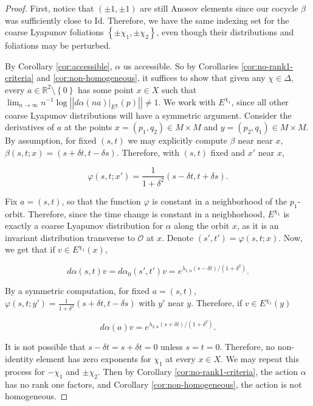 \documentclass[12pt]{amsart}
\theoremstyle{definition}
\theoremstyle{remark}
\numberwithin{equation}{section}
\newcommand{\id}{\mathrm{Id}}
\newcommand{\R}{\mathbb{R}}
\newcommand{\mc}{\mathcal}
\newcommand{\set}[1]{\left\lbrace #1 \right\rbrace}
\newcommand{\norm}[1]{{\left|\left| #1 \right|\right|}}
\newtheorem{Structural Stability Theorem}[theorem]{Structural Stability Theorem}
\begin{document}
\begin{proof}
First, notice that $(\pm 1,\pm 1)$ are still Anosov elements since our cocycle $\beta$ was sufficiently close to $\id$. Therefore, we have the same indexing set for the coarse Lyapunov foliations $\set{\pm \chi_1,\pm \chi_2}$, even though their distributions and foliations may be perturbed.

By Corollary \ref{cor:accessible}, $\alpha$ us accessible. So by Corollaries \ref{cor:no-rank1-criteria} and \ref{cor:non-homogeneous}, it suffices to show that given any $\chi \in \Delta$, every $a \in \R^2 \setminus \set{0}$ has some point $x \in X$ such that $\displaystyle\lim_{n\to \infty} n^{-1}\log \norm{d\alpha(na)|_{E^{\chi}}(p)} \not= 1$. We work with $E^{\chi_1}$, since all other coarse Lyapunov distributions will have a symmetric argument. Consider the derivatives of $a$ at the points $x = (p_1,q_2) \in M \times M$ and $y = (p_2,q_1) \in M \times M$. By assumption, for fixed $(s,t)$ we may explicitly compute $\beta$ near near $x$, $\beta(s,t;x) = (s+\delta t,t-\delta s)$. Therefore, with $(s,t)$ fixed and $x'$ near $x$, 

\[ \varphi(s,t;x') = \frac{1}{1+\delta^2}(s -\delta t,t + \delta s). \] 

Fix $a = (s,t)$, so that the function $\varphi$ is constant in a neighborhood of the $p_1$-orbit. Therefore, since the time change is constant in a neigbhorhood, $E^{\chi_1}$ is exactly a coarse Lyapunov distribution for $\alpha$ along the orbit $x$, as it is an invariant distribution transverse to $\mc O$ at $x$. Denote $(s',t') = \varphi(s,t;x)$. Now, we get that if $v \in E^{\chi_1}(x)$,

\[ d\alpha(s,t)v = d\alpha_0(s',t')v = e^{\lambda_{1,u}(s-\delta t)/(1+\delta^2)}. \]

By a symmetric computation, for fixed $a = (s,t)$, $\varphi(s,t;y') = \frac{1}{1+\delta^2}(s+\delta t,t  - \delta s)$ with $y'$ near $y$. Therefore, if $v \in E^{\chi_1}(y)$

\[ d\alpha(a)v = e^{\lambda_{2,u}(s+\delta t)/(1+\delta^2)}. \]

It is not possible that $s - \delta t = s + \delta t = 0$ unless $s=t = 0$. Therefore, no non-identity element has zero exponents for $\chi_1$ at every $x \in X$. We may repeat this process for $-\chi_1$ and $\pm \chi_2$. Then by Corollary \ref{cor:no-rank1-criteria}, the action $\alpha$ has no rank one factors, and Corollary \ref{cor:non-homogeneous}, the action is not homogeneous.
\end{proof}
\end{document}
